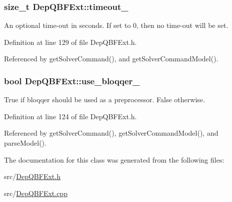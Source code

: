 \hypertarget{classDepQBFExt_ac167b3fa37c76fbfabfa855b329a0dfb}{
\subsubsection[{timeout\-\_\-}]{\setlength{\rightskip}{0pt plus 5cm}size\-\_\-t Dep\-Q\-B\-F\-Ext\-::timeout\-\_\-\hspace{0.3cm}{\ttfamily [protected]}}}\label{classDepQBFExt_ac167b3fa37c76fbfabfa855b329a0dfb}


An optional time-\/out in seconds. If set to 0, then no time-\/out will be set. 



Definition at line 129 of file Dep\-Q\-B\-F\-Ext.\-h.



Referenced by get\-Solver\-Command(), and get\-Solver\-Command\-Model().

\hypertarget{classDepQBFExt_a1ac4c3f5db8b564898de69b88e1757e0}{
\subsubsection[{use\-\_\-bloqqer\-\_\-}]{\setlength{\rightskip}{0pt plus 5cm}bool Dep\-Q\-B\-F\-Ext\-::use\-\_\-bloqqer\-\_\-\hspace{0.3cm}{\ttfamily [protected]}}}\label{classDepQBFExt_a1ac4c3f5db8b564898de69b88e1757e0}


True if bloqqer should be used as a preprocessor. False otherwise. 



Definition at line 124 of file Dep\-Q\-B\-F\-Ext.\-h.



Referenced by get\-Solver\-Command(), get\-Solver\-Command\-Model(), and parse\-Model().



The documentation for this class was generated from the following files\-:\begin{DoxyCompactItemize}
\item 
src/\hyperlink{DepQBFExt_8h}{Dep\-Q\-B\-F\-Ext.\-h}\item 
src/\hyperlink{DepQBFExt_8cpp}{Dep\-Q\-B\-F\-Ext.\-cpp}\end{DoxyCompactItemize}
